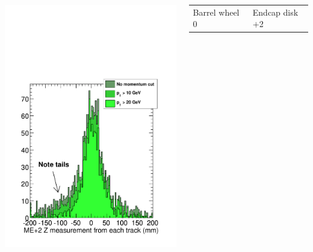 \documentclass[compress]{beamer}
\begin{document}
\begin{frame}
\begin{columns}
\begin{columns}
\includegraphics[width=\linewidth]{residuals_endcap.pdf}
\end{columns}

\begin{tabular}{p{0.5\linewidth} p{0.58\linewidth}}
\scriptsize Barrel wheel 0 & \scriptsize Endcap disk $+$2
\end{tabular}


\end{columns}
\end{frame}
\end{document}
